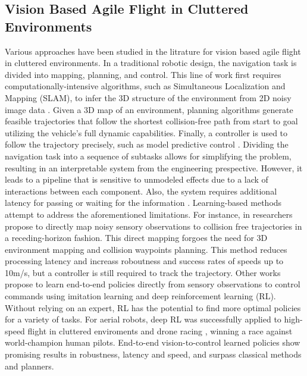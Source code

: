 \documentclass{article}
\begin{document}
\subsection{Vision Based Agile Flight in Cluttered Environments}
Various approaches have been studied in the litrature for vision based agile flight in cluttered environments. In a traditional robotic design, the navigation task is divided into mapping, planning, and control. This line of work first requires computationally-intensive algorithms, such as Simultaneous Localization and Mapping (SLAM), to infer the 3D structure of the environment from 2D noisy image data \cite{zhouSwarmMicroFlying2022, scaramuzzaVisionControlledMicroFlying2014}. Given a 3D map of an environment, planning algorithms generate feasible trajectories that follow the shortest collision-free path from start to goal utilizing the vehicle’s full dynamic capabilities. Finally, a controller is used to follow the trajectory precisely, such as model predictive control \cite{falangaPAMPCPerceptionAwareModel2018}. Dividing the navigation task into a sequence of subtasks allows for simplifying the problem, resulting in an interpretable system from the engineering prespective. However, it leads to a pipeline that is sensitive to unmodeled effects due to a lack of interactions between each component. Also, the system requires additional latency for passing or waiting for the information \cite{loquercioLearningHighSpeedFlight2021}. Learning-based methods attempt to address the aforementioned limitations. For instance, in \cite{loquercioLearningHighSpeedFlight2021} researchers propose to directly map noisy sensory observations to collision free trajectories in a receding-horizon fashion. This direct mapping forgoes the need for 3D environment mapping and collision waypoints planning. This method reduces processing latency and increass roboutness and success rates of speeds up to 10m/s, but a controller is still required to track the trajectory. Other works propose to learn end-to-end policies directly from sensory observations to control commands using imitation learning and deep reinforcement learning (RL). Without relying on an expert, RL has the potential to find more optimal policies for a variety of tasks. For aerial robots, deep RL was successfully applied to high-speed flight in cluttered enviroments \cite{songLearningPerceptionAwareAgile2023} and drone racing \cite{kaufmannChampionlevelDroneRacing2023}, winning a race against world-champion human pilots. End-to-end vision-to-control learned policies show promising results in robustness, latency and speed, and surpass classical methods and planners.
\end{document}
